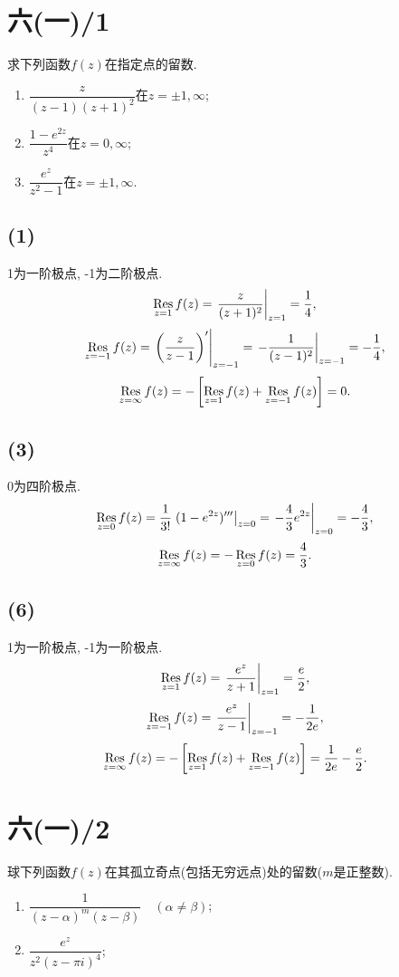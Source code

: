 \documentclass[11pt,a4paper]{article}
\author{刘逸灏 (515370910207)}
\newcommand{\res}[1]{\mathop{\Res}\limits_{#1}}
\begin{document}
\maketitle

\section{六(一)/1}
\begin{problem}
求下列函数$f(z)$在指定点的留数.
\begin{enumerate}
  \item $\dfrac{z}{(z-1)(z+1)^2}$在$z=\pm1,\infty$;
        \addtocounter{enumi}{1}
  \item $\dfrac{1-e^{2z}}{z^4}$在$z=0,\infty$;
        \addtocounter{enumi}{2}
  \item $\dfrac{e^z}{z^2-1}$在$z=\pm1,\infty$.
\end{enumerate}
\end{problem}
\subsection*{(1)}
1为一阶极点, -1为二阶极点.
$$\res{z=1}f(z)=\left.\frac{z}{(z+1)^2}\right|_{z=1}=\frac{1}{4},$$
$$\res{z=-1}f(z)=\left.\left(\frac{z}{z-1}\right)'\right|_{z=-1}=\left.-\frac{1}{(z-1)^2}\right|_{z=-1}=-\frac{1}{4},$$
$$\res{z=\infty}f(z)=-\left[\res{z=1}f(z)+\res{z=-1}f(z)\right]=0.$$

\subsection*{(3)}
0为四阶极点.
$$\res{z=0}f(z)=\frac{1}{3!}\left.(1-e^{2z})'''\right|_{z=0}=\left.-\frac{4}{3}e^{2z}\right|_{z=0}=-\frac{4}{3},$$
$$\res{z=\infty}f(z)=-\res{z=0}f(z)=\frac{4}{3}.$$

\subsection*{(6)}
1为一阶极点, -1为一阶极点.
$$\res{z=1}f(z)=\left.\frac{e^z}{z+1}\right|_{z=1}=\frac{e}{2},$$
$$\res{z=-1}f(z)=\left.\frac{e^z}{z-1}\right|_{z=-1}=-\frac{1}{2e},$$
$$\res{z=\infty}f(z)=-\left[\res{z=1}f(z)+\res{z=-1}f(z)\right]=\frac{1}{2e}-\frac{e}{2}.$$

\section{六(一)/2}
\begin{problem}
球下列函数$f(z)$在其孤立奇点(包括无穷远点)处的留数($m$是正整数).
\begin{enumerate}
  \addtocounter{enumi}{2}
  \item $\dfrac{1}{(z-\alpha)^m(z-\beta)}\quad(\alpha\neq\beta)$;
  \item $\dfrac{e^z}{z^2(z-\pi i)^4}$;
\end{enumerate}
\end{problem}
\end{document}
